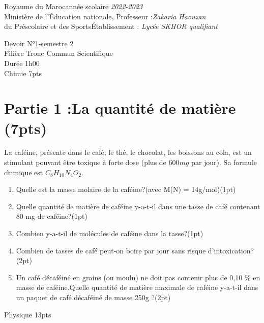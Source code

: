 \documentclass[12pt]{article}
\newcommand\headerMe[2]{\noindent{}#1\hfill#2}
\begin{document}
\headerMe{Royaume du Maroc}{année scolaire \emph{2022-2023}}\\
\headerMe{Ministère de l'Éducation nationale, }{  Professeur :\emph{Zakaria Haouzan}}\\
\headerMe{du Préscolaire et des Sports}{Établissement : \emph{Lycée SKHOR qualifiant}}\\

\begin{center}
Devoir  N°1-semestre 2 \\
   Filière Tronc Commun Scientifique\\
Durée 1h00
\\
    \vspace{.2cm}
\hrulefill
\Large{Chimie 7pts}
\hrulefill\\

\end{center}
 \section*{Partie 1 :La quantité de matière \dotfill (7pts) }
La caféine, présente dans le café, le thé, le chocolat, les boissons au cola, est un stimulant pouvant être toxique à forte dose (plus de $600 mg$ par jour). Sa formule chimique est $C_8H_{10}N_4O_2$.

\begin{enumerate}
    \item Quelle est la masse molaire de la caféine?(avec M(N) = 14g/mol)\dotfill(1pt)
    \item Quelle quantité de matière de caféine y-a-t-il dans une tasse de café contenant 80 mg de caféine?\dotfill(1pt)
    \item Combien y-a-t-il de molécules de caféine dans la tasse?\dotfill(1pt)
    \item Combien de tasses de café peut-on boire par jour sans risque d’intoxication?\dotfill(2pt)
        \item Un café décaféiné en grains (ou moulu) ne doit pas contenir plus de 0,10 \% en masse de caféine.Quelle quantité de matière maximale de caféine y-a-t-il dans un paquet de café décaféiné de masse
            250g ?\dotfill(2pt)
\end{enumerate}

\begin{center}
\hrulefill
\Large{Physique 13pts}
\hrulefill\\
\end{center}
\end{document}
